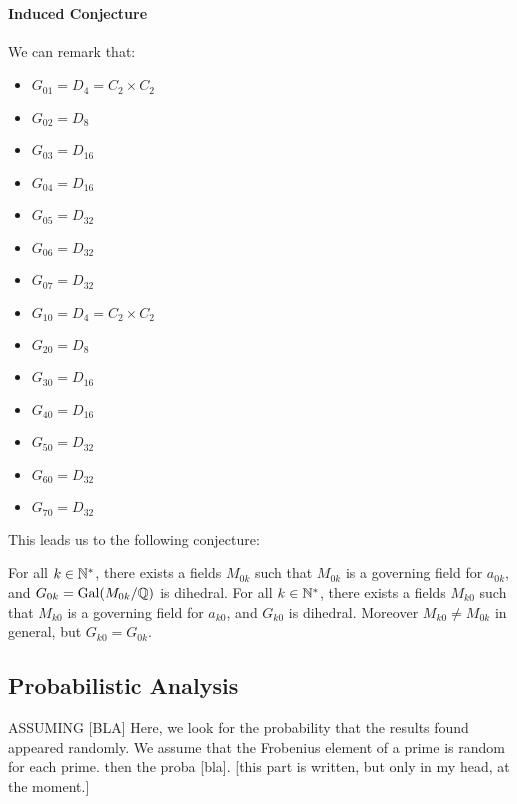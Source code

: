 \paragraph{Induced Conjecture}
We can remark that:
\begin{multicols}{2}
	\begin{itemize}
		\item $G_{01} = D_4 = C_2 \times C_2$
		\item $G_{02} = D_8$
		\item $G_{03} = D_{16}$
		\item $G_{04} = D_{16}$
		\item $G_{05} = D_{32}$
		\item $G_{06} = D_{32}$
		\item $G_{07} = D_{32}$
	\end{itemize}
	\begin{itemize}
		\item $G_{10} = D_4 = C_2 \times C_2$
		\item $G_{20} = D_8$
		\item $G_{30} = D_{16}$
		\item $G_{40} = D_{16}$
		\item $G_{50} = D_{32}$
		\item $G_{60} = D_{32}$
		\item $G_{70} = D_{32}$
	\end{itemize}
\end{multicols}
This leads us to the following conjecture:
\begin{conjecture}
	For all $k \in \mathbb{N}^*$, there exists a fields $M_{0k}$ such that $M_{0k}$ is a governing field for $a_{0k}$, and $G_{0k} = \text{Gal}(M_{0k}/\mathbb{Q})$ is dihedral.
	For all $k \in \mathbb{N}^*$, there exists a fields $M_{k0}$ such that $M_{k0}$ is a governing field for $a_{k0}$, and $G_{k0}$ is dihedral.
	Moreover $M_{k0} \neq M_{0k}$ in general, but $G_{k0} = G_{0k}$.
\end{conjecture}



\subsection{Probabilistic Analysis}
ASSUMING [BLA]
Here, we look for the probability that the results found appeared randomly.
We assume that the Frobenius element of a prime is random for each prime.
then the proba [bla].
[this part is written, but only in my head, at the moment.]

